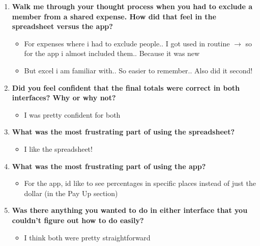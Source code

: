 \documentclass[12pt,a4paper]{article}
\begin{document}
\begin{enumerate}
    \item \textbf{Walk me through your thought process when you had to exclude a member from a shared expense. How did that feel in the spreadsheet versus the app?}
    
    \begin{itemize}
        \item For expenses where i had to exclude people.. I got used in routine $\rightarrow$ so for the app i almost included them.. Because it was new
        \item But excel i am familiar with.. So easier to remember.. Also did it second!
    \end{itemize}
    
    \item \textbf{Did you feel confident that the final totals were correct in both interfaces? Why or why not?}
    
    \begin{itemize}
        \item I was pretty confident for both
    \end{itemize}
    
    \item \textbf{What was the most frustrating part of using the spreadsheet?}
    
    \begin{itemize}
        \item I like the spreadsheet!
    \end{itemize}
    
    \item \textbf{What was the most frustrating part of using the app?}
    
    \begin{itemize}
        \item For the app, id like to see percentages in specific places instead of just the dollar (in the Pay Up section)
    \end{itemize}
    
    \item \textbf{Was there anything you wanted to do in either interface that you couldn't figure out how to do easily?}
    
    \begin{itemize}
        \item I think both were pretty straightforward
    \end{itemize}
\end{enumerate}
\end{document}

